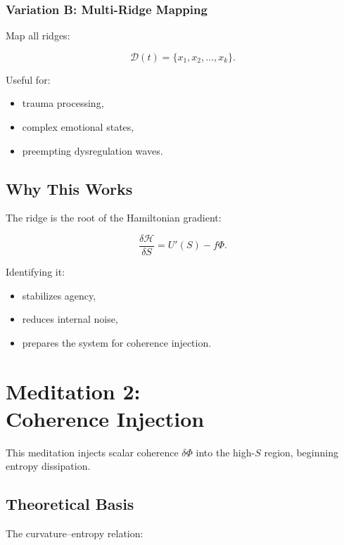 \documentclass[12pt]{article}
\begin{document}
\subsection{Variation B: Multi-Ridge Mapping}

Map all ridges:

\[
\mathcal{D}(t) = \{x_1, x_2, \dots, x_k\}.
\]

Useful for:

\begin{itemize}
    \item trauma processing,
    \item complex emotional states,
    \item preempting dysregulation waves.
\end{itemize}

\section{Why This Works}

The ridge is the root of the Hamiltonian gradient:

\[
\frac{\delta \mathcal{H}}{\delta S}
= U'(S) - f\Phi.
\]

Identifying it:

\begin{itemize}
    \item stabilizes agency,
    \item reduces internal noise,
    \item prepares the system for coherence injection.
\end{itemize}

\newpage

\chapter{Meditation 2:\\ Coherence Injection}

This meditation injects scalar coherence $\delta\Phi$ into the high-$S$ region,
beginning entropy dissipation.

\section{Theoretical Basis}

The curvature--entropy relation:
\end{document}
